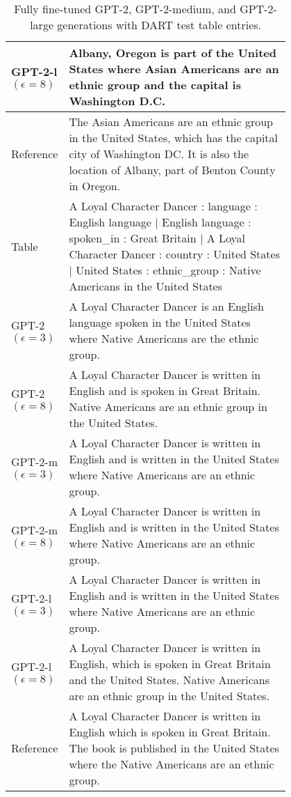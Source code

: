 \begin{table}[h]
\begin{tabular}{l | p{0.8\linewidth}}
GPT-2-l $(\epsilon=8)$ & Albany, Oregon is part of the United States where Asian Americans are an ethnic group and the capital is Washington D.C. \\
\hline
 Reference & The Asian Americans are an ethnic group in the United States, which has the capital city of Washington DC. It is also the location of Albany, part of Benton County in Oregon. \\
\midrule\midrule
Table & A Loyal Character Dancer : language : English language | English language : spoken\_in : Great Britain | A Loyal Character Dancer : country : United States | United States : ethnic\_group : Native Americans in the United States  \\
 \hline
GPT-2 $(\epsilon=3)$ & A Loyal Character Dancer is an English language spoken in the United States where Native Americans are the ethnic group. \\
GPT-2 $(\epsilon=8)$ & A Loyal Character Dancer is written in English and is spoken in Great Britain. Native Americans are an ethnic group in the United States. \\
GPT-2-m $(\epsilon=3)$ & A Loyal Character Dancer is written in English and is written in the United States where Native Americans are an ethnic group. \\
GPT-2-m $(\epsilon=8)$ & A Loyal Character Dancer is written in English and is written in the United States where Native Americans are an ethnic group. \\
GPT-2-l $(\epsilon=3)$ & A Loyal Character Dancer is written in English and is written in the United States where Native Americans are an ethnic group. \\
GPT-2-l $(\epsilon=8)$ & A Loyal Character Dancer is written in English, which is spoken in Great Britain and the United States. Native Americans are an ethnic group in the United States. \\
\hline
 Reference & A Loyal Character Dancer is written in English which is spoken in Great Britain. The book is published in the United States where the Native Americans are an ethnic group. \\
\bottomrule
\end{tabular}
\caption{Fully fine-tuned GPT-2, GPT-2-medium, and GPT-2-large generations with DART test table entries.}
\end{table}


